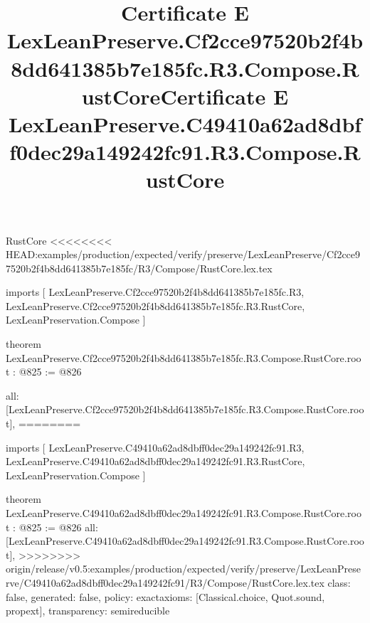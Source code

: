 \begin{lexlean}{RustCore}
<<<<<<<< HEAD:examples/production/expected/verify/preserve/LexLeanPreserve/Cf2cce97520b2f4b8dd641385b7e185fc/R3/Compose/RustCore.lex.tex
\title{Certificate E LexLeanPreserve.Cf2cce97520b2f4b8dd641385b7e185fc.R3.Compose.RustCore}
\begin{coremodule}
imports [
  LexLeanPreserve.Cf2cce97520b2f4b8dd641385b7e185fc.R3,
  LexLeanPreserve.Cf2cce97520b2f4b8dd641385b7e185fc.R3.RustCore,
  LexLeanPreservation.Compose
]

theorem LexLeanPreserve.Cf2cce97520b2f4b8dd641385b7e185fc.R3.Compose.RustCore.root : @825 := @826 {
  all: [LexLeanPreserve.Cf2cce97520b2f4b8dd641385b7e185fc.R3.Compose.RustCore.root],
========
\title{Certificate E LexLeanPreserve.C49410a62ad8dbff0dec29a149242fc91.R3.Compose.RustCore}
\begin{coremodule}
imports [
  LexLeanPreserve.C49410a62ad8dbff0dec29a149242fc91.R3,
  LexLeanPreserve.C49410a62ad8dbff0dec29a149242fc91.R3.RustCore,
  LexLeanPreservation.Compose
]

theorem LexLeanPreserve.C49410a62ad8dbff0dec29a149242fc91.R3.Compose.RustCore.root : @825 := @826 {
  all: [LexLeanPreserve.C49410a62ad8dbff0dec29a149242fc91.R3.Compose.RustCore.root],
>>>>>>>> origin/release/v0.5:examples/production/expected/verify/preserve/LexLeanPreserve/C49410a62ad8dbff0dec29a149242fc91/R3/Compose/RustCore.lex.tex
  class: false,
  generated: false,
  policy: exact{axioms: [Classical.choice, Quot.sound, propext]},
  transparency: semireducible
}


\end{coremodule}}
\end{coremodule}
\end{lexlean}

